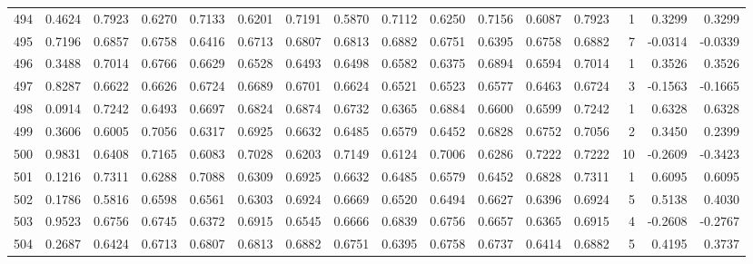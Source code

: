 \begin{tabular}{lrrrrrrrrrrrrrrr}
494 &      0.4624 &  0.7923 &  0.6270 &  0.7133 &  0.6201 &  0.7191 &  0.5870 &  0.7112 &  0.6250 &  0.7156 &   0.6087 &     0.7923 &      1 &                    0.3299 &                     0.3299 \\
495 &      0.7196 &  0.6857 &  0.6758 &  0.6416 &  0.6713 &  0.6807 &  0.6813 &  0.6882 &  0.6751 &  0.6395 &   0.6758 &     0.6882 &      7 &                   -0.0314 &                    -0.0339 \\
496 &      0.3488 &  0.7014 &  0.6766 &  0.6629 &  0.6528 &  0.6493 &  0.6498 &  0.6582 &  0.6375 &  0.6894 &   0.6594 &     0.7014 &      1 &                    0.3526 &                     0.3526 \\
497 &      0.8287 &  0.6622 &  0.6626 &  0.6724 &  0.6689 &  0.6701 &  0.6624 &  0.6521 &  0.6523 &  0.6577 &   0.6463 &     0.6724 &      3 &                   -0.1563 &                    -0.1665 \\
498 &      0.0914 &  0.7242 &  0.6493 &  0.6697 &  0.6824 &  0.6874 &  0.6732 &  0.6365 &  0.6884 &  0.6600 &   0.6599 &     0.7242 &      1 &                    0.6328 &                     0.6328 \\
499 &      0.3606 &  0.6005 &  0.7056 &  0.6317 &  0.6925 &  0.6632 &  0.6485 &  0.6579 &  0.6452 &  0.6828 &   0.6752 &     0.7056 &      2 &                    0.3450 &                     0.2399 \\
500 &      0.9831 &  0.6408 &  0.7165 &  0.6083 &  0.7028 &  0.6203 &  0.7149 &  0.6124 &  0.7006 &  0.6286 &   0.7222 &     0.7222 &     10 &                   -0.2609 &                    -0.3423 \\
501 &      0.1216 &  0.7311 &  0.6288 &  0.7088 &  0.6309 &  0.6925 &  0.6632 &  0.6485 &  0.6579 &  0.6452 &   0.6828 &     0.7311 &      1 &                    0.6095 &                     0.6095 \\
502 &      0.1786 &  0.5816 &  0.6598 &  0.6561 &  0.6303 &  0.6924 &  0.6669 &  0.6520 &  0.6494 &  0.6627 &   0.6396 &     0.6924 &      5 &                    0.5138 &                     0.4030 \\
503 &      0.9523 &  0.6756 &  0.6745 &  0.6372 &  0.6915 &  0.6545 &  0.6666 &  0.6839 &  0.6756 &  0.6657 &   0.6365 &     0.6915 &      4 &                   -0.2608 &                    -0.2767 \\
504 &      0.2687 &  0.6424 &  0.6713 &  0.6807 &  0.6813 &  0.6882 &  0.6751 &  0.6395 &  0.6758 &  0.6737 &   0.6414 &     0.6882 &      5 &                    0.4195 &                     0.3737 \\

\end{tabular}
